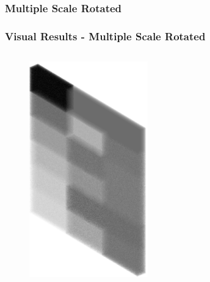 \documentclass[9pt]{beamer}
\begin{document}
\subsubsection{Multiple Scale Rotated}
\begin{frame}
\frametitle{Visual Results - Multiple Scale Rotated}
\begin{columns}
\vspace{-2cm}
\begin{figure}
\includegraphics[width=0.6\textwidth]{multirot.eps}
\end{figure}
\begin{figure}
\begin{tabular}{c c  c }

\end{tabular}
\end{figure}
\end{columns}
\end{frame}
\end{document}
